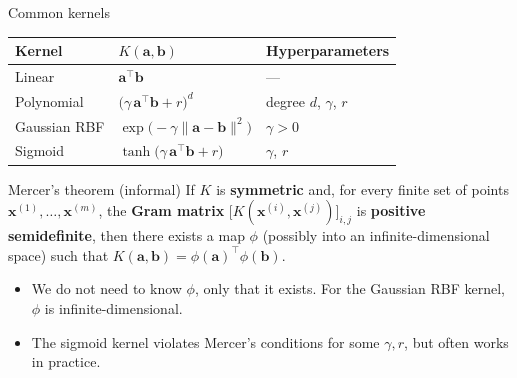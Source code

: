\documentclass[aspectratio=169,10pt]{beamer}
\newcommand{\x}{\mathbf{x}}
\begin{document}
\begin{frame}{Common kernels}
\small
\begin{center}
\begin{tabular}{@{}lll@{}}
\toprule
Kernel & $K(\mathbf a,\mathbf b)$ & Hyperparameters \\
\midrule
Linear & $\mathbf a^\top\mathbf b$ & --- \\
Polynomial & $\big(\gamma\,\mathbf a^\top\mathbf b + r\big)^d$ & degree $d$, $\gamma$, $r$ \\
Gaussian RBF & $\exp\!\big(-\gamma\lVert\mathbf a-\mathbf b\rVert^2\big)$ & $\gamma>0$ \\
Sigmoid & $\tanh\!\big(\gamma\,\mathbf a^\top\mathbf b + r\big)$ & $\gamma$, $r$ \\
\bottomrule
\end{tabular}
\end{center}
\begin{block}{Mercer's theorem (informal)}
If $K$ is \textbf{symmetric} and, for every finite set of points $\x^{(1)},\dots,\x^{(m)}$, the \textbf{Gram matrix} $\big[K(\x^{(i)},\x^{(j)})\big]_{i,j}$ is \textbf{positive semidefinite}, then there exists a map $\phi$ (possibly into an infinite-dimensional space) such that $K(\mathbf a,\mathbf b)=\phi(\mathbf a)^\top\phi(\mathbf b)$.
\end{block}
\begin{itemize}
  \item We do not need to know $\phi$, only that it exists. For the Gaussian RBF kernel, $\phi$ is infinite-dimensional.
  \item The sigmoid kernel violates Mercer's conditions for some $\gamma,r$, but often works in practice.
\end{itemize}
\end{frame}
\end{document}

